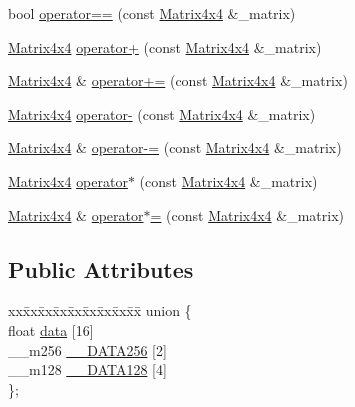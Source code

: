 \begin{DoxyCompactItemize}
\item 
bool \mbox{\hyperlink{structpad_1_1math_1_1_matrix4x4_ae8c88b8c279e8a34a1f3e7e040dc8599}{operator==}} (const \mbox{\hyperlink{structpad_1_1math_1_1_matrix4x4}{Matrix4x4}} \&\+\_\+matrix)
\item 
\mbox{\hyperlink{structpad_1_1math_1_1_matrix4x4}{Matrix4x4}} \mbox{\hyperlink{structpad_1_1math_1_1_matrix4x4_acacb8a40fc9d329f40cdb6f23592e347}{operator+}} (const \mbox{\hyperlink{structpad_1_1math_1_1_matrix4x4}{Matrix4x4}} \&\+\_\+matrix)
\item 
\mbox{\hyperlink{structpad_1_1math_1_1_matrix4x4}{Matrix4x4}} \& \mbox{\hyperlink{structpad_1_1math_1_1_matrix4x4_a41fee92ff1bcaada31a4d5ca828f5486}{operator+=}} (const \mbox{\hyperlink{structpad_1_1math_1_1_matrix4x4}{Matrix4x4}} \&\+\_\+matrix)
\item 
\mbox{\hyperlink{structpad_1_1math_1_1_matrix4x4}{Matrix4x4}} \mbox{\hyperlink{structpad_1_1math_1_1_matrix4x4_a15e852769583fe62d7691a9f55b15d2f}{operator-\/}} (const \mbox{\hyperlink{structpad_1_1math_1_1_matrix4x4}{Matrix4x4}} \&\+\_\+matrix)
\item 
\mbox{\hyperlink{structpad_1_1math_1_1_matrix4x4}{Matrix4x4}} \& \mbox{\hyperlink{structpad_1_1math_1_1_matrix4x4_a9ff7cd4357169ae04f5330dfa1a3bb64}{operator-\/=}} (const \mbox{\hyperlink{structpad_1_1math_1_1_matrix4x4}{Matrix4x4}} \&\+\_\+matrix)
\item 
\mbox{\hyperlink{structpad_1_1math_1_1_matrix4x4}{Matrix4x4}} \mbox{\hyperlink{structpad_1_1math_1_1_matrix4x4_a6f3bc37ce2fcfa89fa7b9e641969e684}{operator$\ast$}} (const \mbox{\hyperlink{structpad_1_1math_1_1_matrix4x4}{Matrix4x4}} \&\+\_\+matrix)
\item 
\mbox{\hyperlink{structpad_1_1math_1_1_matrix4x4}{Matrix4x4}} \& \mbox{\hyperlink{structpad_1_1math_1_1_matrix4x4_a78d1c63256e91dcd87fe34f3e1f42246}{operator$\ast$=}} (const \mbox{\hyperlink{structpad_1_1math_1_1_matrix4x4}{Matrix4x4}} \&\+\_\+matrix)
\end{DoxyCompactItemize}
\subsection*{Public Attributes}
\begin{DoxyCompactItemize}
\item 
\begin{tabbing}
xx\=xx\=xx\=xx\=xx\=xx\=xx\=xx\=xx\=\kill
union \{\\
\>float \mbox{\hyperlink{structpad_1_1math_1_1_matrix4x4_a3ce7e8b8246a13268d4bc9c5d2f202f7}{data}} \mbox{[}16\mbox{]}\\
\>\_\_m256 \mbox{\hyperlink{structpad_1_1math_1_1_matrix4x4_a1943e1b4a06834d2ff79192b9688463c}{\_\_DATA256}} \mbox{[}2\mbox{]}\\
\>\_\_m128 \mbox{\hyperlink{structpad_1_1math_1_1_matrix4x4_ac736c31530295349e0ba6a0cfa566271}{\_\_DATA128}} \mbox{[}4\mbox{]}\\
\}; \\

\end{tabbing}\end{DoxyCompactItemize}


